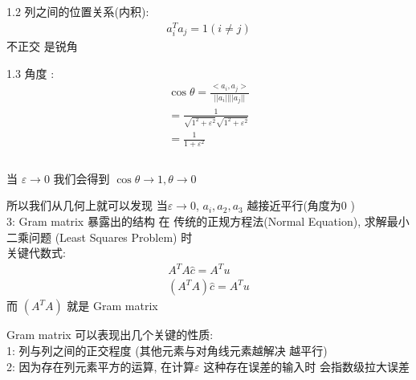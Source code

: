 \documentclass[12pt]{article}
\begin{document}
\begin{flushleft}
    1.2 列之间的位置关系(内积): \\
    \begin{align}
        a_{i}^{T}a_{j} = 1  (i \neq j)
    \end{align}
    不正交 是锐角

    1.3 角度 : \\
    \begin{align}
        \cos\theta  = \frac{<a_{i},a_{j}>}{||a_{i}||||a_{j}||}                   \\
        = \frac{1}{\sqrt{1^{2} + \varepsilon^{2}}\sqrt{1^{2} + \varepsilon^{2}}} \\
        = \frac{1}{1 +  \varepsilon^{2}}                                         \\
    \end{align} \\
    当 $\varepsilon \to 0$ 我们会得到 $\cos\theta \to 1,  \theta \to 0$

    所以我们从几何上就可以发现 当$\varepsilon \to 0$, $a_{i}, a_{2}, a_{3}$ 越接近平行(角度为0 ) \\


    3: Gram matrix 暴露出的结构
    在 传统的正规方程法(Normal Equation), 求解最小二乘问题 (Least Squares Problem) 时 \\
    关键代数式: \\
    \begin{align}
        A^{T}A\hat{c} = A^{T}u \\
        (A^{T}A)\hat{c} = A^{T}u
    \end{align}
    而 $(A^{T}A)$ 就是 Gram matrix

    Gram matrix 可以表现出几个关键的性质: \\
    1: 列与列之间的正交程度 (其他元素与对角线元素越解决 越平行) \\
    2: 因为存在列元素平方的运算, 在计算$\varepsilon$ 这种存在误差的输入时 会指数级拉大误差 \\


\end{flushleft}
\end{document}
